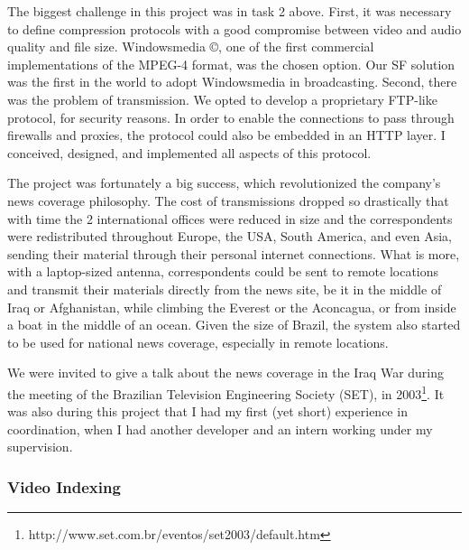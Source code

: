 \documentclass[a4paper]{article}
\begin{document}
The biggest challenge in this project was in task 2 above. First, it was necessary to define compression protocols with a good compromise between video and audio quality and file size. Windowsmedia \copyright, one of the first commercial implementations of the MPEG-4 format, was the chosen option. Our SF solution was the first in the world to adopt Windowsmedia in broadcasting. Second, there was the problem of transmission. We opted to develop a proprietary FTP-like protocol, for security reasons. In order to enable the connections to pass through firewalls and proxies, the protocol could also be embedded in an HTTP layer. I conceived, designed, and implemented all aspects of this protocol. 

The project was fortunately a big success, which revolutionized the company's news coverage philosophy. The cost of transmissions dropped so drastically that with time the 2 international offices were reduced in size and the correspondents were redistributed throughout Europe, the USA, South America, and even Asia, sending their material through their personal internet connections. What is more, with a laptop-sized antenna, correspondents could be sent to remote locations and transmit their materials directly from the news site, be it in the middle of Iraq or Afghanistan, while climbing the Everest or the Aconcagua, or from inside a boat in the middle of an ocean. Given the size of Brazil, the system also started to be used for national news coverage, especially in remote locations. 

We were invited to give a talk about the news coverage in the Iraq War during the meeting of the Brazilian Television Engineering Society (SET), in 2003\footnote{http://www.set.com.br/eventos/set2003/default.htm}. It was also during this project that I had my first (yet short) experience in coordination, when I had another developer and an intern working under my supervision.

\subsubsection{Video Indexing}
\end{document}
